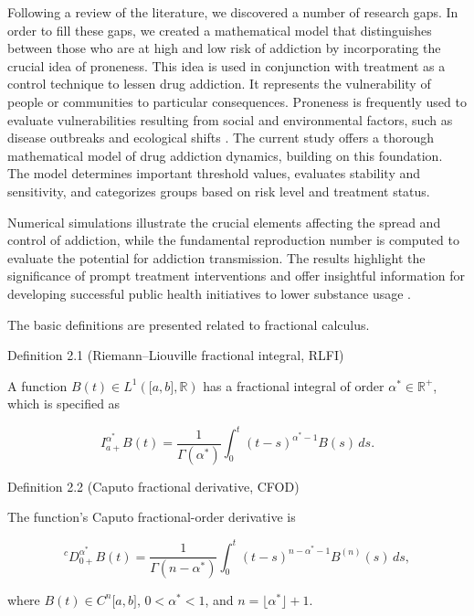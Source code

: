 \documentclass[10pt]{NSP1}
\begin{document}
Following a review of the literature, we discovered a number of research gaps. In order to fill these gaps, we created a mathematical model that distinguishes between those who are at high and low risk of addiction by incorporating the crucial idea of proneness. This idea is used in conjunction with treatment as a control technique to lessen drug addiction. It represents the vulnerability of people or communities to particular consequences. Proneness is frequently used to evaluate vulnerabilities resulting from social and environmental factors, such as disease outbreaks and ecological shifts . The current study offers a thorough mathematical model of drug addiction dynamics, building on this foundation. The model determines important threshold values, evaluates stability and sensitivity, and categorizes groups based on risk level and treatment status.

Numerical simulations illustrate the crucial elements affecting the spread and control of addiction, while the fundamental reproduction number is computed to evaluate the potential for addiction transmission. The results highlight the significance of prompt treatment interventions and offer insightful information for developing successful public health initiatives to lower substance usage .

\par\medskip{}\smallskip

The basic definitions are presented related to fractional calculus.

Definition 2.1 (Riemann–Liouville fractional integral, RLFI)

A function \(B(t) \in L^{1}\left( \lbrack a,b\rbrack,\mathbb{R} \right)\) has a fractional integral of order \(\alpha^{*} \in \mathbb{R}^{+}\), which is specified as

\[
I_{a +}^{\alpha^{*}}B(t) = \frac{1}{\Gamma\left( \alpha^{*} \right)}\int_{0}^{t}(t - s)^{\alpha^{*} - 1}B(s)\, ds.
\]

Definition 2.2 (Caputo fractional derivative, CFOD)

The function’s Caputo fractional-order derivative is

\[
^{c}D_{0 +}^{\alpha^{*}}B(t) = \frac{1}{\Gamma\left( n - \alpha^{*} \right)}\int_{0}^{t}(t - s)^{n - \alpha^{*} - 1}B^{(n)}(s)\, ds,
\]

where \(B(t) \in C^{n}\lbrack a,b\rbrack\), \(0 < \alpha^{*} < 1\), and \(n = \lfloor\alpha^{*}\rfloor + 1\).
\end{document}
